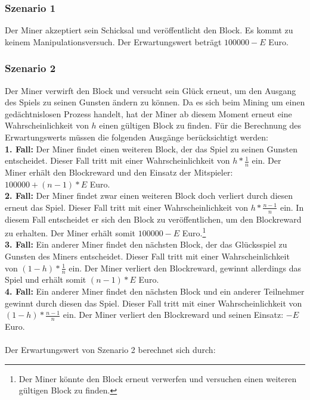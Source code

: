 \subsubsection{Szenario 1} 
Der Miner akzeptiert sein Schicksal und veröffentlicht den Block. Es kommt zu keinem Manipulationsversuch. Der Erwartungswert beträgt $100000 - E$ Euro.
\subsubsection{Szenario 2} 
Der Miner verwirft den Block und versucht sein Glück erneut, um den Ausgang des Spiels zu seinen Gunsten ändern zu können. Da es sich beim Mining um einen gedächtnislosen Prozess handelt, hat der Miner ab diesem Moment erneut eine Wahrscheinlichkeit von $h$ einen gültigen Block zu finden. Für die Berechnung des Erwartungswerts müssen die folgenden Ausgänge berücksichtigt werden:\\
\textbf{1. Fall:} Der Miner findet einen weiteren Block, der das Spiel zu seinen Gunsten entscheidet. Dieser Fall tritt mit einer Wahrscheinlichkeit von $h*\frac{1}{n}$ ein. Der Miner erhält den Blockreward und den Einsatz der Mitspieler: $100000 + (n-1)*E$ Euro.\\
\textbf{2. Fall:} Der Miner findet zwar einen weiteren Block doch verliert durch diesen erneut das Spiel. Dieser Fall tritt mit einer Wahrscheinlichkeit von $h*\frac{n-1}{n}$ ein. In diesem Fall entscheidet er sich den Block zu veröffentlichen, um den Blockreward zu erhalten. Der Miner erhält somit $100000 - E$ Euro.\footnote{Der Miner könnte den Block erneut verwerfen und versuchen einen weiteren gültigen Block zu finden.}\\
\textbf{3. Fall:} Ein anderer Miner findet den nächsten Block, der das Glücksspiel zu Gunsten des Miners entscheidet. Dieser Fall tritt mit einer Wahrscheinlichkeit von $(1-h)*\frac{1}{n}$ ein. Der Miner verliert den Blockreward, gewinnt allerdings das Spiel und erhält somit $(n-1)*E$ Euro.\\
\textbf{4. Fall:} Ein anderer Miner findet den nächsten Block und ein anderer Teilnehmer gewinnt durch diesen das Spiel. Dieser Fall tritt mit einer Wahrscheinlichkeit von $(1-h)*\frac{n-1}{n}$ ein. Der Miner verliert den Blockreward und seinen Einsatz: $-E$ Euro.\\\\
Der Erwartungswert von Szenario 2 berechnet sich durch:\\
